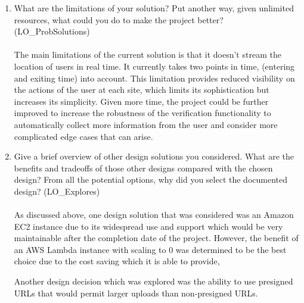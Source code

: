 \documentclass[12pt, titlepage]{article}
\begin{document}
\begin{enumerate}
  \item What are the limitations of your solution?  Put another way, given
    unlimited resources, what could you do to make the project
    better? (LO\_ProbSolutions)
    \\
    \\
    The main limitations of the current solution is that it doesn't stream the location of users in real time.
    It currently takes two points in time, (entering and exiting time) into account. This limitation provides reduced visibility on the actions of the user at each site,
    which limits its sophistication but increases its simplicity. Given more time, the project could be further improved to increase the robustness of the verification
    functionality to automatically collect more information from the user and consider more complicated edge cases that can arise.

  \item Give a brief overview of other design solutions you considered.  What
    are the benefits and tradeoffs of those other designs compared
    with the chosen
    design?  From all the potential options, why did you select the
    documented design?
    (LO\_Explores)
    \\
    \\
    As discussed above, one design solution that was considered was an Amazon EC2 instance due to its widespread use and support which would be very maintainable
    after the completion date of the project. However, the benefit of an AWS Lambda instance with scaling to 0 was determined to be the best choice due to the cost
    saving which it is able to provide,

    Another design decision which was explored was the ability to use presigned URLs that would permit larger uploads than non-presigned URLs.
\end{enumerate}
\end{document}

